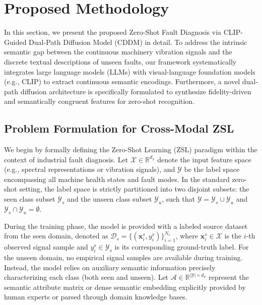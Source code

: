 \section{Proposed Methodology}
\label{sec:methodology}

In this section, we present the proposed Zero-Shot Fault Diagnosis via CLIP-Guided Dual-Path Diffusion Model (CDDM) in detail. To address the intrinsic semantic gap between the continuous machinery vibration signals and the discrete textual descriptions of unseen faults, our framework systematically integrates large language models (LLMs) with visual-language foundation models (e.g., CLIP) to extract continuous semantic encodings. Furthermore, a novel dual-path diffusion architecture is specifically formulated to synthesize fidelity-driven and semantically congruent features for zero-shot recognition. 

\subsection{Problem Formulation for Cross-Modal ZSL}
\label{subsec:problem_formulation}

We begin by formally defining the Zero-Shot Learning (ZSL) paradigm within the context of industrial fault diagnosis. Let $\mathcal{X} \in \mathbb{R}^{d_x}$ denote the input feature space (e.g., spectral \cite{smith2011scientist} representations or vibration signals), and $\mathcal{Y}$ be the label space encompassing all machine health states and fault modes. In the standard zero-shot setting, the label space is strictly partitioned into two disjoint subsets: the seen class subset $\mathcal{Y}_s$ and the unseen class subset $\mathcal{Y}_u$, such that $\mathcal{Y} = \mathcal{Y}_s \cup \mathcal{Y}_u$ and $\mathcal{Y}_s \cap \mathcal{Y}_u = \emptyset$.

During the training phase, the model is provided with a labeled source dataset from the seen domain, denoted as $\mathcal{D}_s = \{(\mathbf{x}_i^s, y_i^s)\}_{i=1}^{N_s}$, where $\mathbf{x}_i^s \in \mathcal{X}$ is the $i$-th observed signal sample and $y_i^s \in \mathcal{Y}_s$ is its corresponding ground-truth label. For the unseen domain, no empirical signal samples are available during training. Instead, the model relies on auxiliary semantic information precisely characterizing each class (both seen and unseen). Let $\mathcal{A} \in \mathbb{R}^{|\mathcal{Y}| \times d_a}$ represent the semantic attribute matrix or dense semantic embedding \cite{mikolov2013efficient} explicitly provided by human experts or parsed through domain knowledge bases. 

